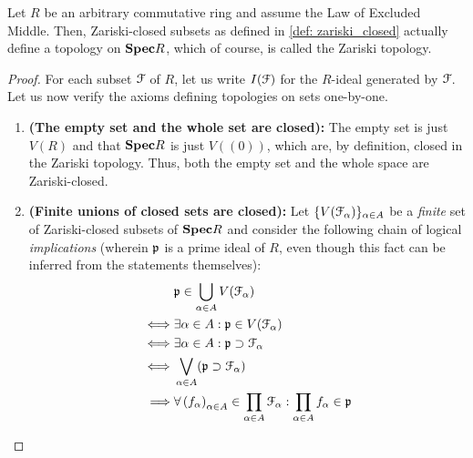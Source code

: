                 \begin{proposition} \label{prop: zariski_closed_well_definiteness}
                    Let $R$ be an arbitrary commutative ring and assume the Law of Excluded Middle. Then, Zariski-closed subsets as defined in \ref{def: zariski_closed} actually define a topology on $\Spec R$, which of course, is called the Zariski topology.
                \end{proposition}
                    \begin{proof}
                        For each subset $\calF$ of $R$, let us write $I(\calF)$ for the $R$-ideal generated by $\calF$. Let us now verify the axioms defining topologies on sets one-by-one.
                            \begin{enumerate}
                                \item \textbf{(The empty set and the whole set are closed):} The empty set is just $V(R)$ and that $\Spec R$ is just $V\left((0)\right)$, which are, by definition, closed in the Zariski topology. Thus, both the empty set and the whole space are Zariski-closed.
                                \item \textbf{(Finite unions of closed sets are closed):} Let $\{V(\calF_{\alpha})\}_{\alpha \in A}$ be a \textit{finite} set of Zariski-closed subsets of $\Spec R$ and consider the following chain of logical \textit{implications} (wherein $\p$ is a prime ideal of $R$, even though this fact can be inferred from the statements themselves):
                                    $$
                                        \begin{aligned}
                                            & \p \in \bigcup_{\alpha \in A} V(\calF_{\alpha})
                                            \\
                                            \iff & \exists \alpha \in A: \p \in V(\calF_{\alpha})
                                            \\
                                            \iff & \exists \alpha \in A: \p \supset \calF_{\alpha}
                                            \\
                                            \iff & \bigvee_{\alpha \in A} (\p \supset \calF_{\alpha})
                                            \\
                                            \implies & \forall \left(f_{\alpha}\right)_{\alpha \in A} \in \prod_{\alpha \in A} \calF_{\alpha}: \prod_{\alpha \in A} f_{\alpha} \in \p

\end{aligned}$$
\end{enumerate}
\end{proof}
